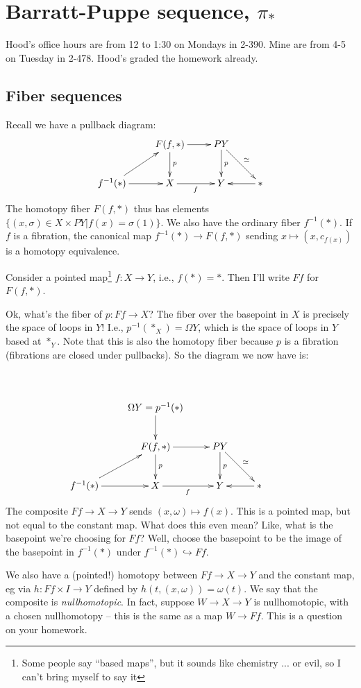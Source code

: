 \chapter{Barratt-Puppe sequence, $\pi_\ast$}
Hood's office hours are from 12 to 1:30 on Mondays in 2-390. Mine are from 4-5 on Tuesday in 2-478. Hood's graded the homework already.
\section{Fiber sequences}
Recall we have a pullback diagram:
\begin{equation*}
    \xymatrix{
	& F(f,\ast)\ar[r]\ar[d]^p & PY\ar[d]^p\ar[dr]^{\simeq} & \\
	f^{-1}(\ast)\ar[ur]\ar[r] & X\ar[r]_f & Y & \ast\ar[l]
    }
\end{equation*}
The homotopy fiber $F(f,\ast)$ thus has elements $\{(x,\sigma)\in X\times PY| f(x) = \sigma(1)\}$. We also have the ordinary fiber $f^{-1}(\ast)$. If $f$ is a fibration, the canonical map $f^{-1}(\ast)\to F(f,\ast)$ sending $x\mapsto(x,c_{f(x)})$ is a homotopy equivalence.
\begin{remark}
Consider a pointed map\footnote{Some people say ``based maps'', but it sounds like chemistry ... or evil, so I can't bring myself to say it} $f:X\to Y$, i.e., $f(\ast) = \ast$. Then I'll write $Ff$ for $F(f,\ast)$.
\end{remark}
Ok, what's the fiber of $p:Ff\to X$? The fiber over the basepoint in $X$ is precisely the space of loops in $Y$! I.e., $p^{-1}(\ast_X) = \Omega Y$, which is the space of loops in $Y$ based at $\ast_Y$. Note that this is also the homotopy fiber because $p$ is a fibration (fibrations are closed under pullbacks). So the diagram we now have is:
\begin{equation*}
\xymatrix{\\
    & \Omega Y=p^{-1}(\ast)\ar[d] & & &\\
    & F(f,\ast)\ar[r]\ar[d]^p & PY\ar[d]^p\ar[dr]^{\simeq} & \\
    f^{-1}(\ast)\ar[ur]\ar[r] & X\ar[r]_f & Y & \ast\ar[l]
}
\end{equation*}
The composite $Ff\to X\to Y$ sends $(x,\omega)\mapsto f(x)$. This is a pointed map, but not equal to the constant map. What does this even mean? Like, what is the basepoint we're choosing for $Ff$? Well, choose the basepoint to be the image of the basepoint in $f^{-1}(\ast)$ under $f^{-1}(\ast)\hookrightarrow Ff$.

We also have a (pointed!) homotopy between $Ff\to X\to Y$ and the constant map, eg via $h:Ff\times I\to Y$ defined by $h(t,(x,\omega)) = \omega(t)$. We say that the composite is \emph{nullhomotopic}. In fact, suppose $W\to X\to Y$ is nullhomotopic, with a chosen nullhomotopy -- this is the same as a map $W\to Ff$. This is a question on your homework.

